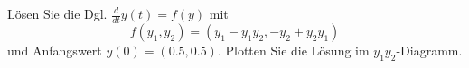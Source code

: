 \begin{aufg}[0]
Lösen Sie  die Dgl. $\frac{d}{dt} y(t) = f(y)$ mit
  \[ f(y_1,y_2)=(y_1 -y_1 y_2, -y_2+y_2 y_1)\]
 und Anfangswert
  $y(0)=(0.5,0.5)$. Plotten Sie die Lösung im $y_1y_2$-Diagramm.
\end{aufg}